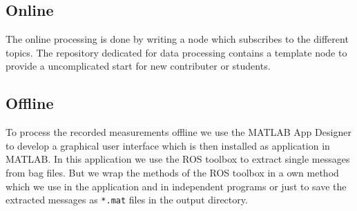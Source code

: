 \subsection{Online}\label{ch:realization:ssec:online}

The online processing is done by writing a node which subscribes to the different topics.
The repository dedicated for data processing contains a template node to provide a uncomplicated start for new contributer or students.

\subsection{Offline}\label{ch:realization:ssec:offline}

To process the recorded measurements offline we use the MATLAB App Designer to develop a graphical user interface which is then installed as application in MATLAB.
In this application we use the ROS toolbox to extract single messages from bag files.
But we wrap the methods of the ROS toolbox in a own method which we use in the application and in independent programs or just to save the extracted messages as \texttt{*.mat} files in the output directory.

